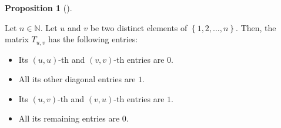 \documentclass[numbers=enddot,12pt,final,onecolumn,notitlepage]{scrartcl}%
\theoremstyle{definition}
\newtheorem{prop}[theo]{Proposition}
\newenvironment{proposition}[1][]
{\begin{prop}[#1]\begin{leftbar}}
{\end{leftbar}\end{prop}}
\begin{document}
\begin{proposition}
\label{prop.Tuv.entries}Let $n\in\mathbb{N}$. Let $u$ and $v$ be two distinct
elements of $\left\{  1,2,\ldots,n\right\}  $. Then, the matrix $T_{u,v}$ has
the following entries:

\begin{itemize}
\item Its $\left(  u,u\right)  $-th and $\left(  v,v\right)  $-th entries are
$0$.

\item All its other diagonal entries are $1$.

\item Its $\left(  u,v\right)  $-th and $\left(  v,u\right)  $-th entries are
$1$.

\item All its remaining entries are $0$.
\end{itemize}
\end{proposition}
\end{document}
